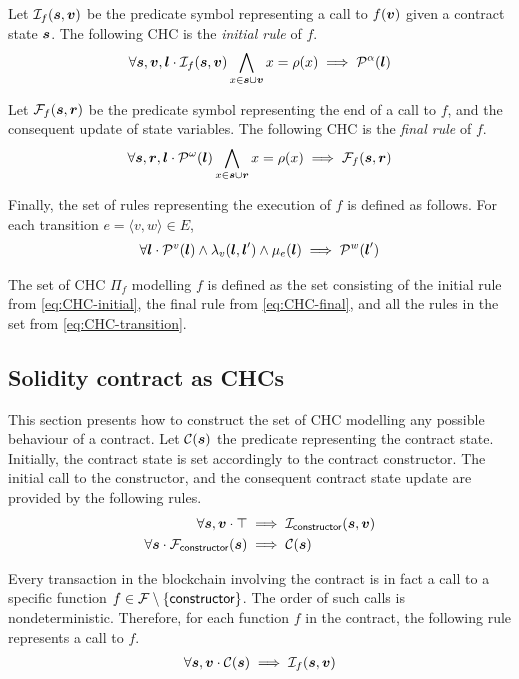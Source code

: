 Let $\mathcal{I}_f(\boldsymbol{s},\boldsymbol{v})$ be the predicate symbol
representing a call to $f(\boldsymbol{v})$ given a contract state $\boldsymbol{s}$.
The following CHC is the {\em initial rule} of $f$.
\begin{align}
\label{eq:CHC-initial}
\forall\svar,\farg,\lvar\cdot\inP_f(\svar,\farg)\bigwedge_{x\in\svar\cup\farg}x=\rho(x)\implies\pred^\alpha(\lvar)
\end{align}

Let $\mathcal{F}_f(\boldsymbol{s},\boldsymbol{r})$ be the predicate symbol
representing the end of a call to $f$, and the consequent
update of state variables. The following CHC is the 
{\em final rule} of $f$.
\begin{align}
\label{eq:CHC-final}
\forall\svar,\rvar,\lvar\cdot\pred^\omega(\lvar)\bigwedge_{x\in\svar\cup\rvar}x=\rho(x)\implies\finP_f(\svar,\rvar)
\end{align}

Finally, the set of rules representing the execution of $f$ is defined as follows.
For each transition $e=\langle v,w\rangle\in E$,
\begin{align}
\label{eq:CHC-transition}
\forall\lvar\cdot\pred^v(\lvar)\wedge\lambda_v(\lvar,\lvar')\wedge\mu_e(\lvar)\implies\pred^w(\lvar')	
\end{align}

The set of CHC $\Pi_f$ modelling $f$ is defined as the set
consisting of the initial rule from \cref{eq:CHC-initial},
the final rule from \cref{eq:CHC-final}, and all the 
rules in the set from \cref{eq:CHC-transition}.

\subsection{Solidity contract as CHCs}
This section presents how to construct the set of CHC 
modelling any possible behaviour of a contract.
Let $\mathcal{C}(\boldsymbol{s})$ the predicate representing the contract state.
Initially, the contract state is set accordingly to the contract
constructor. 
The initial call to the constructor, and the consequent 
contract state update are provided by the following rules.
\begin{align}
\label{eq:CHC-constructor-initial}
\forall\svar,\farg\cdot\top&\implies\inP_\constructor(\svar,\farg)\\
\label{eq:CHC-constructor-final}
\forall\svar\cdot\finP_\constructor(\svar)&\implies\conP(\svar)
\end{align}

Every transaction in the blockchain
involving the contract is in fact a call
to a specific function 
\mbox{$f\in\mathcal{F}\setminus\{\mathsf{constructor}\}$}. 
The order of such calls is
nondeterministic. Therefore, for each function $f$ in the contract, 
the following rule represents a call to $f$.
\begin{align}
\label{eq:CHC-call-initial}
\forall\svar,\farg\cdot\conP(\svar)\implies\inP_f(\svar,\farg)
\end{align}

